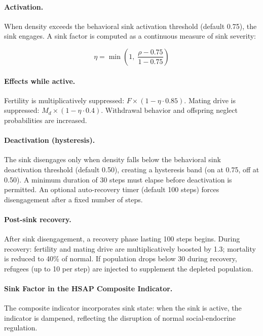 \paragraph{Activation.}
When density exceeds the behavioral sink activation threshold (default 0.75), the sink engages. A sink factor is computed as a continuous measure of sink severity:

\begin{equation}
\eta = \min\left(1,\; \frac{\rho - 0.75}{1 - 0.75}\right)
\label{eq:sink_factor}
\end{equation}

\paragraph{Effects while active.}
Fertility is multiplicatively suppressed: $F \times (1 - \eta \cdot 0.85)$. Mating drive is suppressed: $M_d \times (1 - \eta \cdot 0.4)$. Withdrawal behavior and offspring neglect probabilities are increased.

\paragraph{Deactivation (hysteresis).}
The sink disengages only when density falls below the behavioral sink deactivation threshold (default 0.50), creating a hysteresis band (on at 0.75, off at 0.50). A minimum duration of 30 steps must elapse before deactivation is permitted. An optional auto-recovery timer (default 100 steps) forces disengagement after a fixed number of steps.

\paragraph{Post-sink recovery.}
After sink disengagement, a recovery phase lasting 100 steps begins. During recovery: fertility and mating drive are multiplicatively boosted by 1.3; mortality is reduced to 40\% of normal. If population drops below 30 during recovery, refugees (up to 10 per step) are injected to supplement the depleted population.

\paragraph{Sink Factor in the HSAP Composite Indicator.}
The composite indicator incorporates sink state: when the sink is active, the indicator is dampened, reflecting the disruption of normal social-endocrine regulation.

